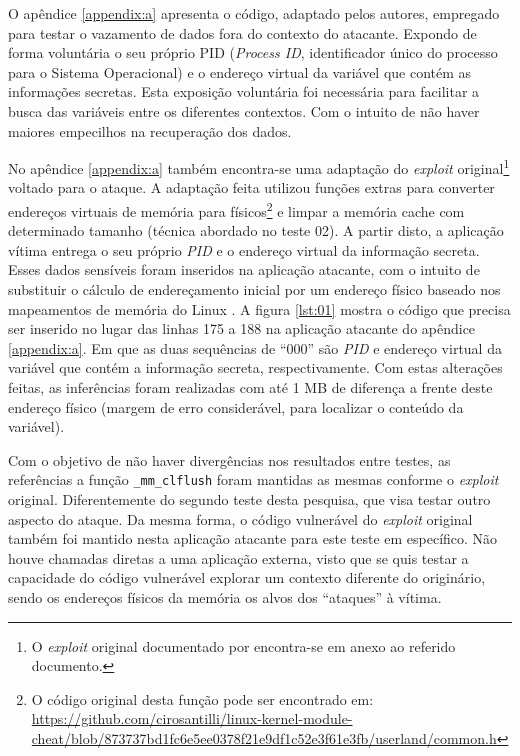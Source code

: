 \documentclass[conference]{IEEEtran}
\begin{document}
O apêndice \ref{appendix:a} apresenta o código, adaptado pelos autores, empregado para testar o vazamento de dados fora do contexto do atacante. Expondo de forma voluntária o seu próprio PID (\emph{Process ID}, identificador único do processo para o Sistema Operacional) e o endereço virtual da variável que contém as informações secretas. Esta exposição voluntária foi necessária para facilitar a busca das variáveis entre os diferentes contextos. Com o intuito de não haver maiores empecilhos na recuperação dos dados.

No apêndice \ref{appendix:a} também encontra-se uma adaptação do \emph{exploit} original\footnote{O \emph{exploit} original documentado por  encontra-se em anexo ao referido documento.} voltado para o ataque. A adaptação feita utilizou funções extras para converter endereços virtuais de memória para físicos\footnote{O código original desta função pode ser encontrado em: \url{https://github.com/cirosantilli/linux-kernel-module-cheat/blob/873737bd1fc6e5ee0378f21e9df1c52e3f61e3fb/userland/common.h}} e limpar a memória cache com determinado tamanho (técnica abordado no teste 02). A partir disto, a aplicação vítima entrega o seu próprio \emph{PID} e o endereço virtual da informação secreta. Esses dados sensíveis foram inseridos na aplicação atacante, com o intuito de substituir o cálculo de endereçamento inicial por um endereço físico baseado nos mapeamentos de memória do Linux \cite{EQWARE2009Capturing}. A figura \ref{lst:01} mostra o código que precisa ser inserido no lugar das linhas 175 a 188 na aplicação atacante do apêndice \ref{appendix:a}. Em que as duas sequências de ``000'' são \emph{PID} e endereço virtual da variável que contém a informação secreta, respectivamente. Com estas alterações feitas, as inferências foram realizadas com até 1 MB de diferença a frente deste endereço físico (margem de erro considerável, para localizar o conteúdo da variável).

Com o objetivo de não haver divergências nos resultados entre testes, as referências a função \lstinline[language=C, style=c]{_mm_clflush} foram mantidas as mesmas conforme o \emph{exploit} original. Diferentemente do segundo teste desta pesquisa, que visa testar outro aspecto do ataque. Da mesma forma, o código vulnerável do \emph{exploit} original também foi mantido nesta aplicação atacante para este teste em específico. Não houve chamadas diretas a uma aplicação externa, visto que se quis testar a capacidade do código vulnerável explorar um contexto diferente do originário, sendo os endereços físicos da memória os alvos dos ``ataques'' à vítima.
\end{document}
